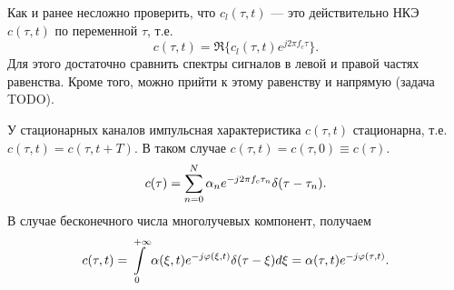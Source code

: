 \documentclass{book}
\numberwithin{theorem}{chapter}
\numberwithin{statement}{chapter}
\numberwithin{lemma}{chapter}
\theoremstyle{definition}
\numberwithin{task}{chapter}
\theoremstyle{remark}
\numberwithin{example}{chapter}
\theoremstyle{definition}
\numberwithin{definition}{chapter}
\theoremstyle{remark}
\theoremstyle{remark}
\numberwithin{lyrics}{section}
\begin{document}
Как и ранее несложно проверить, что $c_l(\tau, t)$ --- это действительно НКЭ $c(\tau, t)$ по переменной $\tau$, т.е. 
$$
c(\tau, t) = \Re\{c_l(\tau, t) e^{j2\pi f_c \tau}\}.
$$
Для этого достаточно сравнить спектры сигналов в левой и правой частях равенства. Кроме того, можно прийти к этому равенству и напрямую (задача TODO).

У стационарных каналов импульсная характеристика $c(\tau,  t)$ стационарна, т.е. $c(\tau, t) = c(\tau, t + T)$. В таком случае $c(\tau, t) = c(\tau, 0) \equiv c(\tau)$.
\begin{equation}
c(\tau) = \sum\limits_{n = 0}^{N} \alpha_n e^{-j2\pi f_c \tau_n} \delta(\tau - \tau_n).
\end{equation}
В случае бесконечного числа многолучевых компонент, получаем
\begin{equation}
c(\tau, t) = \int\limits_{0}^{+\infty} \alpha(\xi, t) e^{-j\varphi(\xi, t)} \delta(\tau - \xi) d\xi = 
\alpha(\tau, t) e^{-j \varphi(\tau, t)}.
\end{equation}
\end{document}
